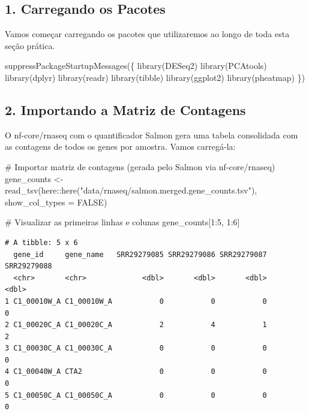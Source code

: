 \documentclass[
  letterpaper,
  DIV=11,
  numbers=noendperiod]{scrreprt}
\newenvironment{Shaded}{\begin{snugshade}}{\end{snugshade}}
\newcommand{\AttributeTok}[1]{\textcolor[rgb]{0.40,0.45,0.13}{#1}}
\newcommand{\CommentTok}[1]{\textcolor[rgb]{0.37,0.37,0.37}{#1}}
\newcommand{\ConstantTok}[1]{\textcolor[rgb]{0.56,0.35,0.01}{#1}}
\newcommand{\DecValTok}[1]{\textcolor[rgb]{0.68,0.00,0.00}{#1}}
\newcommand{\FunctionTok}[1]{\textcolor[rgb]{0.28,0.35,0.67}{#1}}
\newcommand{\NormalTok}[1]{\textcolor[rgb]{0.00,0.23,0.31}{#1}}
\newcommand{\OtherTok}[1]{\textcolor[rgb]{0.00,0.23,0.31}{#1}}
\newcommand{\SpecialCharTok}[1]{\textcolor[rgb]{0.37,0.37,0.37}{#1}}
\newcommand{\StringTok}[1]{\textcolor[rgb]{0.13,0.47,0.30}{#1}}
\begin{document}
\subsection{1. Carregando os Pacotes}\label{carregando-os-pacotes}

Vamos começar carregando os pacotes que utilizaremos ao longo de toda
esta seção prática.

\begin{Shaded}
\begin{Highlighting}[]
\FunctionTok{suppressPackageStartupMessages}\NormalTok{(\{}
  \FunctionTok{library}\NormalTok{(DESeq2)}
  \FunctionTok{library}\NormalTok{(PCAtools)}
  \FunctionTok{library}\NormalTok{(dplyr)}
  \FunctionTok{library}\NormalTok{(readr)}
  \FunctionTok{library}\NormalTok{(tibble)}
  \FunctionTok{library}\NormalTok{(ggplot2)}
  \FunctionTok{library}\NormalTok{(pheatmap)}
\NormalTok{\})}
\end{Highlighting}
\end{Shaded}

\subsection{2. Importando a Matriz de
Contagens}\label{importando-a-matriz-de-contagens}

O nf-core/rnaseq com o quantificador Salmon gera uma tabela consolidada
com as contagens de todos os genes por amostra. Vamos carregá-la:

\begin{Shaded}
\begin{Highlighting}[]
\CommentTok{\# Importar matriz de contagens (gerada pelo Salmon via nf{-}core/rnaseq)}
\NormalTok{gene\_counts }\OtherTok{\textless{}{-}} \FunctionTok{read\_tsv}\NormalTok{(here}\SpecialCharTok{::}\FunctionTok{here}\NormalTok{(}\StringTok{"data/rnaseq/salmon.merged.gene\_counts.tsv"}\NormalTok{),}
                        \AttributeTok{show\_col\_types =} \ConstantTok{FALSE}\NormalTok{)}

\CommentTok{\# Visualizar as primeiras linhas e colunas}
\NormalTok{gene\_counts[}\DecValTok{1}\SpecialCharTok{:}\DecValTok{5}\NormalTok{, }\DecValTok{1}\SpecialCharTok{:}\DecValTok{6}\NormalTok{]}
\end{Highlighting}
\end{Shaded}

\begin{verbatim}
# A tibble: 5 x 6
  gene_id     gene_name   SRR29279085 SRR29279086 SRR29279087 SRR29279088
  <chr>       <chr>             <dbl>       <dbl>       <dbl>       <dbl>
1 C1_00010W_A C1_00010W_A           0           0           0           0
2 C1_00020C_A C1_00020C_A           2           4           1           2
3 C1_00030C_A C1_00030C_A           0           0           0           0
4 C1_00040W_A CTA2                  0           0           0           0
5 C1_00050C_A C1_00050C_A           0           0           0           0
\end{verbatim}
\end{document}
